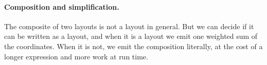 \paragraph{Composition and simplification.} The composite of two layouts is not
a layout in general. But we can decide if it can be written as a layout, and
when it is a layout we emit one weighted sum of the coordinates. When it is
not, we emit the composition literally, at the cost of a longer expression and
more work at run time.
